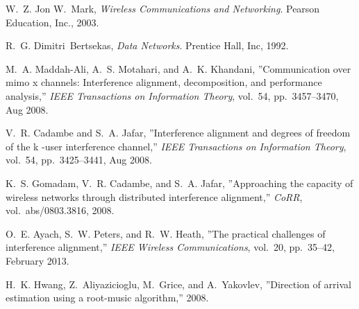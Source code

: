 \documentclass[10pt, a4paper, twocolumn]{IEEEtran}
\begin{document}
\begin{thebibliography}{1}

W.~Z. Jon W.~Mark, {\em Wireless Communications and Networking}.
\newblock Pearson Education, Inc., 2003.

R.~G. Dimitri~Bertsekas, {\em Data Networks}.
\newblock Prentice Hall, Inc, 1992.

M.~A. Maddah-Ali, A.~S. Motahari, and A.~K. Khandani, ''Communication over mimo
  x channels: Interference alignment, decomposition, and performance
  analysis,'' {\em IEEE Transactions on Information Theory}, vol.~54,
  pp.~3457--3470, Aug 2008.

V.~R. Cadambe and S.~A. Jafar, ''Interference alignment and degrees of freedom
  of the k -user interference channel,'' {\em IEEE Transactions on Information
  Theory}, vol.~54, pp.~3425--3441, Aug 2008.

K.~S. Gomadam, V.~R. Cadambe, and S.~A. Jafar, ''Approaching the capacity of
  wireless networks through distributed interference alignment,'' {\em CoRR},
  vol.~abs/0803.3816, 2008.

O.~E. Ayach, S.~W. Peters, and R.~W. Heath, ''The practical challenges of
  interference alignment,'' {\em IEEE Wireless Communications}, vol.~20,
  pp.~35--42, February 2013.

H.~K. Hwang, Z.~Aliyazicioglu, M.~Grice, and A.~Yakovlev, ''Direction of
  arrival estimation using a root-music algorithm,'' 2008.

\end{thebibliography}
\end{document}
